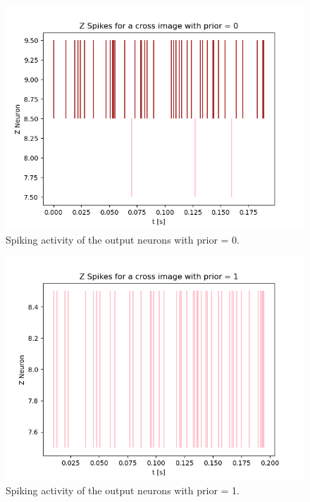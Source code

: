 \begin{figure}
  \includegraphics[width=\linewidth]{figures/horvertAdaptiveInh/20priors_pos5and12/crossZSpikes0.png}
  \caption{ Spiking activity of the output neurons with prior = 0. }
  \label{fig:horvertAdaptiveInhibitionPriorValSpikes0}
\end{figure}

\begin{figure}
  \includegraphics[width=\linewidth]{figures/horvertAdaptiveInh/20priors_pos5and12/crossZSpikes1.png}
  \caption{ Spiking activity of the output neurons with prior = 1. }
  \label{fig:horvertAdaptiveInhibitionPriorValSpikes1}
\end{figure}

